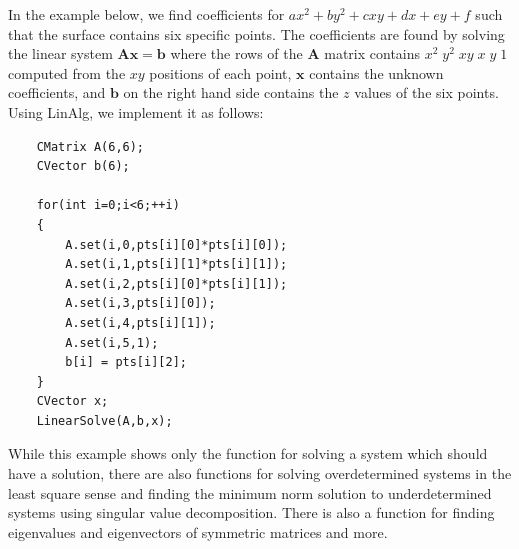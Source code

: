 \documentclass[a4paper]{article}
\begin{document}
In the example below, we  find coefficients for $a x^2 + b y^2 +cxy + dx + ey + f$ such that the surface contains six specific points. The coefficients are found by solving the linear system $\mathbf A \mathbf x = \mathbf b$ where the rows of the $\mathbf A$ matrix contains $x^2 \; y^2 \; xy \; x \; y \; 1$ computed from the $xy$ positions of each point, $\mathbf x$ contains the unknown coefficients, and $\mathbf b$ on the right hand side contains the $z$ values of the six points. Using LinAlg, we implement it as follows: 
\begin{verbatim}
    CMatrix A(6,6);
    CVector b(6);
    
    for(int i=0;i<6;++i)
    {
        A.set(i,0,pts[i][0]*pts[i][0]);
        A.set(i,1,pts[i][1]*pts[i][1]);
        A.set(i,2,pts[i][0]*pts[i][1]);
        A.set(i,3,pts[i][0]);
        A.set(i,4,pts[i][1]);
        A.set(i,5,1);
        b[i] = pts[i][2];
    }
    CVector x;
    LinearSolve(A,b,x);
\end{verbatim}
While this example shows only the function for solving a system which should have a solution, there are also functions for solving overdetermined systems in the least square sense and finding the minimum norm solution to underdetermined systems using singular value decomposition. There is also a function for finding eigenvalues and eigenvectors of symmetric matrices and more.
\end{document}
